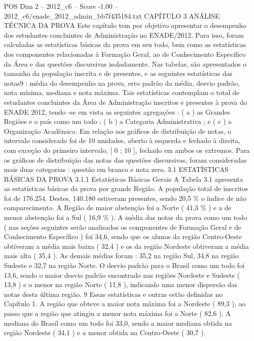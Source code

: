 \begin{textsample}{POS Dim 2 – 2012\_c6 – Score -1.00 – 2012\_c6/enade\_2012\_admin\_bb7f435184.txt}  \label{ex:f2_pos_250}
CAPÍTULO 3 ANÁLISE TÉCNICA DA PROVA Este capítulo tem por objetivo apresentar o desempenho dos estudantes concluintes de Administração no ENADE/2012.
Para isso, foram calculadas as estatísticas básicas da prova em seu todo, bem como as estatísticas dos componentes relacionadas à Formação Geral, ao de Conhecimento Específico da Área e das questões discursivas isoladamente.
Nas tabelas, são apresentados o tamanho da população inscrita e de presentes, e as seguintes estatísticas das notas9 : média do desempenho na prova, erro padrão da média, desvio padrão, nota mínima, mediana e nota máxima.
Tais estatísticas contemplam o total de estudantes concluintes da Área de Administração inscritos e presentes à prova do ENADE 2012, tendo -se em vista as seguintes agregações : ( a ) as Grandes Regiões e o país como um todo ; ( b ) a Categoria Administrativa ; e ( c ) a Organização Acadêmica.
Em relação aos gráficos de distribuição de notas, o intervalo considerado foi de 10 unidades, aberto à esquerda e fechado à direita, com exceção do primeiro intervalo, [ 0 ; 10 ], fechado em ambos os extremos.
Para os gráficos de distribuição das notas das questões discursivas, foram consideradas mais duas categorias : questão em branco e nota zero. 3.1 ESTATÍSTICAS BÁSICAS DA PROVA 3.1.1 Estatísticas Básicas Gerais A Tabela 3.1 apresenta as estatísticas básicas da prova por grande Região.
A população total de inscritos foi de 176.254.
Destes, 140.180 estiveram presentes, sendo 20,5 \% o índice de não comparecimento.
A Região de maior abstenção foi a Norte ( 41,3 \% ) e a de menor abstenção foi a Sul ( 16,9 \% ).
A média das notas da prova como um todo ( nas seções seguintes serão analisados os componentes de Formação Geral e de Conhecimento Específico ) foi 34,6, sendo que os alunos da região Centro-Oeste obtiveram a média mais baixa ( 32,4 ) e os da região Nordeste obtiveram a média mais alta ( 35,4 ).
As demais médias foram : 35,2 na região Sul, 34,8 na região Sudeste e 32,7 na região Norte.
O desvio padrão para o Brasil como um todo foi 13,6, sendo o maior desvio padrão encontrado nas regiões Nordeste e Sudeste ( 13,8 ) e o menor na região Norte ( 11,8 ), indicando uma menor dispersão das notas desta última região. 9 Essas estatísticas e outras estão definidas no Capítulo 1.
A região que obteve a maior nota máxima foi a Nordeste ( 89,3 ), ao passo que a região que atingiu a menor nota máxima foi a Norte ( 82,6 ).
A mediana do Brasil como um todo foi 33,0, sendo a maior mediana obtida na região Nordeste ( 34,1 ) e a menor obtida na Centro-Oeste ( 30,7 ).

\end{textsample}
